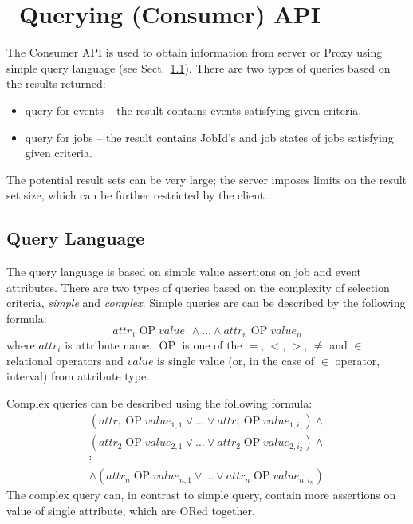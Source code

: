 
\section{\LB\ Querying (Consumer) API}
\label{s:Consumer-API}
The \LB Consumer API is used to obtain information from \LB server
or Proxy using simple query language (see
Sect.~\ref{s:querylang}). There are two types of queries based
on the results returned:
\begin{itemize}
\item query for events -- the result contains events satisfying given
criteria,
\item query for jobs -- the result contains JobId's and job states of jobs
satisfying given criteria.
\end{itemize}
The potential result sets can be very large; the \LB server imposes
limits on the result set size, which can be further restricted by the
client.


\subsection{Query Language}
\label{s:querylang}
The \LB query language is based on simple value assertions on job and
event attributes. There are two types of queries based on the
complexity of selection criteria, \textit{simple} and
\textit{complex}.
Simple queries are can be described by the following formula:
\begin{displaymath}
\textit{attr}_1 \mathop{\textrm{ OP }} \textit{value}_1 \wedge \dots \wedge
\textit{attr}_n \mathop{\textrm{ OP }} \textit{value}_n
\end{displaymath}
where $\textit{attr}_i$ is attribute name, $\mathop{\textrm{ OP }}$ is
one of the $=$, $<$, $>$, $\neq$ and $\in$ relational operators and
$\textit{value}$ is single value (or, in the case of $\in$ operator,
interval) from attribute type.

Complex queries can be described using the following formula:
\begin{multline*}
(\textit{attr}_1 \mathop{\textrm{ OP }} \textit{value}_{1,1} \vee \dots \vee
\textit{attr}_1 \mathop{\textrm{ OP }} \textit{value}_{1,i_1}) \wedge \\
(\textit{attr}_2 \mathop{\textrm{ OP }} \textit{value}_{2,1} \vee \dots \vee
\textit{attr}_2 \mathop{\textrm{ OP }} \textit{value}_{2,i_2}) \wedge \\
\vdots \\
\wedge (\textit{attr}_n \mathop{\textrm{ OP }} \textit{value}_{n,1} \vee \dots \vee
\textit{attr}_n \mathop{\textrm{ OP }} \textit{value}_{n,i_n})
\end{multline*}
The complex query can, in contrast to simple query, contain more
assertions on value of single attribute, which are ORed together.

